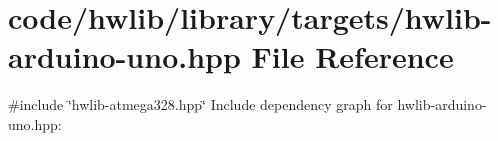 \hypertarget{hwlib-arduino-uno_8hpp}{}\section{code/hwlib/library/targets/hwlib-\/arduino-\/uno.hpp File Reference}
\label{hwlib-arduino-uno_8hpp}
{\ttfamily \#include \char`\"{}hwlib-\/atmega328.\+hpp\char`\"{}}\newline
Include dependency graph for hwlib-\/arduino-\/uno.hpp\+:
